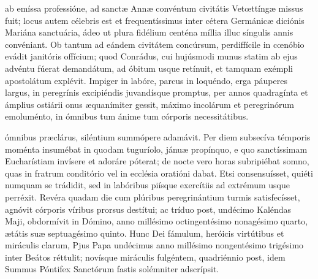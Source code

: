 \documentclass[fontsize=9pt,paper=A6,twoside,BCOR=1mm,DIV=22,headinclude]{scrarticle}
\begin{document}
\begin{multicols}{2}
\RVCiv 

 ab emíssa professióne, ad sanctæ Annæ convéntum civitátis Vetœttíngæ missus fuit; locus autem célebris est et frequentíssimus inter cétera Germánicæ diciónis Mariána sanctuária, ádeo ut plura fidélium centéna míllia illuc síngulis annis convéniant. Ob tantum ad eándem civitátem concúrsum, perdiffícile in cœnóbio evádit janitóris offícium; quod Conrádus, cui hujúsmodi munus statim ab ejus advéntu fúerat demandátum, ad óbitum usque retínuit, et tamquam exémpli apostolátum explévit. Impiger in labóre, parcus in loquéndo, erga páuperes largus, in peregrínis excipiéndis juvandísque promptus, per annos quadragínta et ámplius ostiárii onus æquanímiter gessit, máximo incolárum et peregrinórum emoluménto, in ómnibus tum ánime tum córporis necessitátibus.

\RVCv 

{
 ómnibus præclárus, siléntium summópere adamávit. Per diem subsecíva témporis moménta insumébat in quodam tuguríolo, jánuæ propínquo, e quo sanctíssimam Eucharístiam invísere et adoráre póterat; de nocte vero horas subripiébat somno, quas in fratrum conditório vel in ecclésia oratióni dabat. Etsi consensuísset, quiéti numquam se trádidit, sed in labóribus piísque exercítiis ad extrémum usque perréxit. Revéra quadam die cum plúribus peregrinántium turmis satisfecísset, agnóvit córporis víribus prorsus destítui; ac tríduo post, undécimo Kaléndas Maji, obdormívit in Dómino, anno millésimo octingentésimo nonagésimo quarto, ætátis suæ septuagésimo quinto. Hunc Dei fámulum, heróicis virtútibus et miráculis clarum, Pjus Papa undécimus anno millésimo nongentésimo trigésimo inter Beátos réttulit; novísque miráculis fulgéntem, quadriénnio post, idem Summus Póntifex Sanctórum fastis solémniter adscrípsit.

\RVCvi 


}
\end{multicols}
\end{document}
